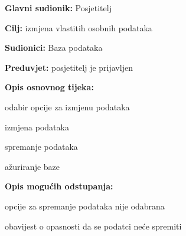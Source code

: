 					\noindent {}
					\begin{packed_item}
	
						\item \textbf{Glavni sudionik: }Posjetitelj
						\item  \textbf{Cilj:} izmjena vlastitih osobnih podataka
						\item  \textbf{Sudionici:} Baza podataka
						\item  \textbf{Preduvjet:} posjetitelj je prijavljen
						\item  \textbf{Opis osnovnog tijeka:}
						
						\item[] \begin{packed_enum}
	
							\item odabir opcije za izmjenu podataka
							\item izmjena podataka
							\item spremanje podataka 
							\item ažuriranje baze
							
						\end{packed_enum}
						
						\item  \textbf{Opis mogućih odstupanja:}
						
						\item[] \begin{packed_item}
	
							\item[2.a] opcije za spremanje podataka nije odabrana
							\item[] \begin{packed_enum}
								
								\item obavijest o opasnosti da se podatci neće spremiti
								
							\end{packed_enum}
						
							
						\end{packed_item}
					\end{packed_item}
					

